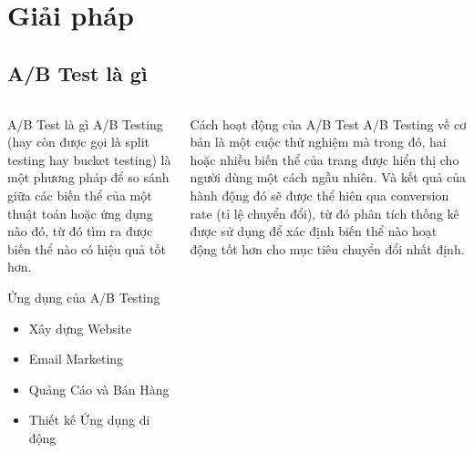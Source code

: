 \section{Giải pháp}

\subsection{A/B Test là gì}

\begin{frame}
	\begin{columns}
		\begin{column}{0.5\textwidth}
			\begin{block}{A/B Test là gì}
				\alert{A/B Testing} (hay còn được gọi là split testing hay bucket testing) là một phương pháp để so sánh giữa các biến thể của một thuật toán hoặc ứng dụng nào đó, từ đó tìm ra được biến thể nào có hiệu quả tốt hơn.
			\end{block}
			\begin{block}{Ứng dụng của \alert{A/B Testing}}
				\begin{itemize}
					\item Xây dựng Website
					\item Email Marketing
					\item Quảng Cáo và Bán Hàng
					\item Thiết kế Ứng dụng di động
				\end{itemize}
			\end{block}
		\end{column}
		\begin{column}{0.5\textwidth}
			\begin{block}{Cách hoạt động của A/B Test}
				\alert{A/B Testing} về cơ bản là một cuộc thử nghiệm mà trong đó, hai hoặc nhiều biến thể của trang được hiển thị cho người dùng một cách ngẫu nhiên. Và kết quả của hành động đó sẽ được thể hiên qua conversion rate (tỉ lệ chuyển đổi), từ đó phân tích thống kê được sử dụng để xác định biến thể nào hoạt động tốt hơn cho mục tiêu chuyển đổi nhất định.
			\end{block}
		\end{column}
	\end{columns}
\end{frame}


